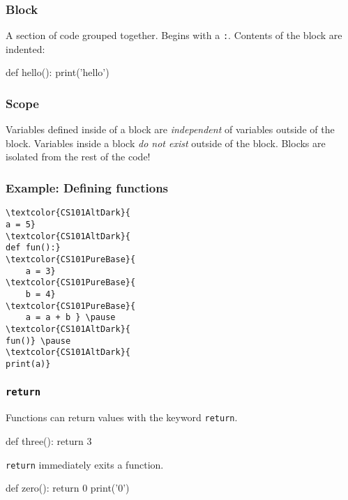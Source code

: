 \documentclass[11pt]{beamer}
\begin{document}
\begin{frame}[fragile]
  \frametitle{Block}
  \Enlarge

  \begin{itemize}
  \myitem  A section of code grouped together. \pause
  \myitem  Begins with a \texttt{:}. \pause
  \myitem  Contents of the block are indented:
  \end{itemize}
  \begin{semiverbatim}
def hello():
    print('hello')
  \end{semiverbatim}
\end{frame}

\begin{frame}
  \frametitle{Scope}
  \Enlarge

  \begin{itemize}
  \myitem  Variables defined inside of a block are \emph{independent} of variables outside of the block. \pause
  \myitem  Variables inside a block \emph{do not exist} outside of the block. \pause
  \myitem  Blocks are isolated from the rest of the code!
  \end{itemize}
\end{frame}

\begin{frame}[fragile]
  \frametitle{Example:  Defining functions}
  \Enlarge

  \begin{Verbatim}[commandchars=\\\{\}]
\textcolor{CS101AltDark}{
a = 5}
\textcolor{CS101AltDark}{
def fun():}
\textcolor{CS101PureBase}{
    a = 3}
\textcolor{CS101PureBase}{
    b = 4}
\textcolor{CS101PureBase}{
    a = a + b } \pause
\textcolor{CS101AltDark}{
fun()} \pause
\textcolor{CS101AltDark}{
print(a)}
  \end{Verbatim}
\end{frame}

\begin{frame}[fragile]
  \frametitle{\texttt{return}}
  \Enlarge

  \begin{itemize}
  \myitem  Functions can return values with the keyword \texttt{return}. \pause
    \begin{semiverbatim}
def three():
    return 3
    \end{semiverbatim} \pause
  \myitem  \texttt{return} immediately exits a function. \pause
    \begin{semiverbatim}
def zero():
  return 0
  print('0')
    \end{semiverbatim}
  \end{itemize}
\end{frame}
\end{document}
